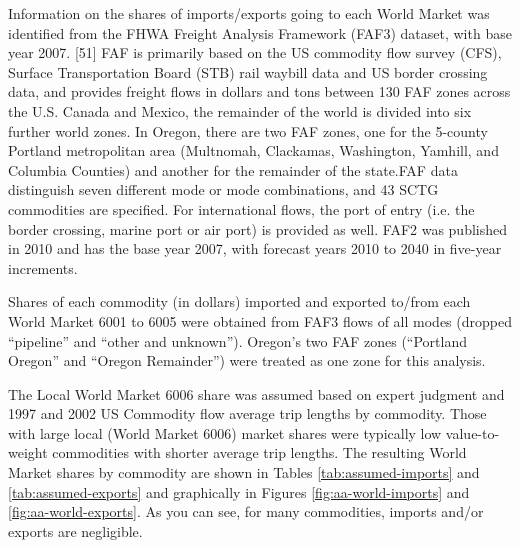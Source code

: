 Information on the shares of imports/exports going to each World Market was identified from the FHWA Freight Analysis Framework (FAF3) dataset, with base year 2007. [51]  FAF is primarily based on the US commodity flow survey (CFS), Surface Transportation Board (STB) rail waybill data and US border crossing data, and provides freight flows in dollars and tons between 130 FAF zones across the U.S. Canada and Mexico, the remainder of the world is divided into six further world zones. In Oregon, there are two FAF zones, one for the 5-county Portland metropolitan area (Multnomah, Clackamas, Washington, Yamhill, and Columbia Counties) and another for the remainder of the state.FAF data distinguish seven different mode or mode combinations, and 43 SCTG commodities are specified. For international flows, the port of entry (i.e. the border crossing, marine port or air port) is provided as well. FAF2 was published in 2010 and has the base year 2007, with forecast years 2010 to 2040 in five-year increments. 

Shares of each commodity (in dollars) imported and exported to/from each World Market 6001 to 6005 were obtained from FAF3 flows of all modes (dropped ``pipeline'' and ``other and unknown''). Oregon's two FAF zones (``Portland Oregon'' and ``Oregon Remainder'') were treated as one zone for this analysis.

The Local World Market 6006 share was assumed based on expert judgment and 1997 and 2002 US Commodity flow average trip lengths by commodity. Those with large local (World Market 6006) market shares were typically low value-to-weight commodities with shorter average trip lengths. The resulting World Market shares by commodity are shown in Tables \ref{tab:assumed-imports} and \ref{tab:assumed-exports} and graphically in Figures \ref{fig:aa-world-imports} and \ref{fig:aa-world-exports}. As you can see, for many commodities, imports and/or exports are negligible.





